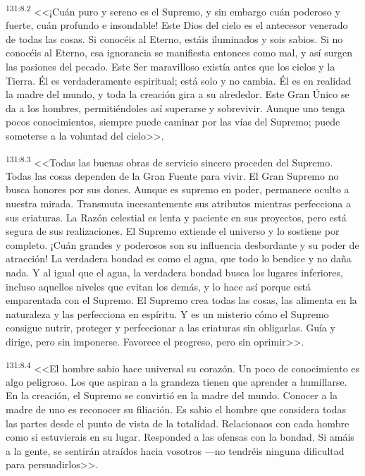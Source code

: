\par 
\textsuperscript{131:8.2} <<¡Cuán puro y sereno es el Supremo, y sin embargo cuán poderoso y fuerte, cuán profundo e insondable! Este Dios del cielo es el antecesor venerado de todas las cosas. Si conocéis al Eterno, estáis iluminados y sois sabios. Si no conocéis al Eterno, esa ignorancia se manifiesta entonces como mal, y así surgen las pasiones del pecado. Este Ser maravilloso existía antes que los cielos y la Tierra. Él es verdaderamente espiritual; está solo y no cambia. Él es en realidad la madre del mundo, y toda la creación gira a su alrededor. Este Gran Único se da a los hombres, permitiéndoles así superarse y sobrevivir. Aunque uno tenga pocos conocimientos, siempre puede caminar por las vías del Supremo; puede someterse a la voluntad del cielo>>.

\par 
\textsuperscript{131:8.3} <<Todas las buenas obras de servicio sincero proceden del Supremo. Todas las cosas dependen de la Gran Fuente para vivir. El Gran Supremo no busca honores por sus dones. Aunque es supremo en poder, permanece oculto a nuestra mirada. Transmuta incesantemente sus atributos mientras perfecciona a sus criaturas. La Razón celestial es lenta y paciente en sus proyectos, pero está segura de sus realizaciones. El Supremo extiende el universo y lo sostiene por completo. ¡Cuán grandes y poderosos son su influencia desbordante y su poder de atracción! La verdadera bondad es como el agua, que todo lo bendice y no daña nada. Y al igual que el agua, la verdadera bondad busca los lugares inferiores, incluso aquellos niveles que evitan los demás, y lo hace así porque está emparentada con el Supremo. El Supremo crea todas las cosas, las alimenta en la naturaleza y las perfecciona en espíritu. Y es un misterio cómo el Supremo consigue nutrir, proteger y perfeccionar a las criaturas sin obligarlas. Guía y dirige, pero sin imponerse. Favorece el progreso, pero sin oprimir>>.

\par 
\textsuperscript{131:8.4} <<El hombre sabio hace universal su corazón. Un poco de conocimiento es algo peligroso. Los que aspiran a la grandeza tienen que aprender a humillarse. En la creación, el Supremo se convirtió en la madre del mundo. Conocer a la madre de uno es reconocer su filiación. Es sabio el hombre que considera todas las partes desde el punto de vista de la totalidad. Relacionaos con cada hombre como si estuvierais en su lugar. Responded a las ofensas con la bondad. Si amáis a la gente, se sentirán atraídos hacia vosotros ---no tendréis ninguna dificultad para persuadirlos>>.

